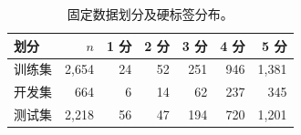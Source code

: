 \begin{table}[H]
\centering
\caption{固定数据划分及硬标签分布。}
\label{tab:data_distribution}
\small
\begin{tabular}{lrrrrrr}
\toprule
划分 & $n$ & 1 分 & 2 分 & 3 分 & 4 分 & 5 分 \\
\midrule
训练集 & 2,654 & 24 & 52 & 251 & 946 & 1,381 \\
开发集 & 664 & 6 & 14 & 62 & 237 & 345 \\
测试集 & 2,218 & 56 & 47 & 194 & 720 & 1,201 \\
\bottomrule
\end{tabular}
\end{table}
